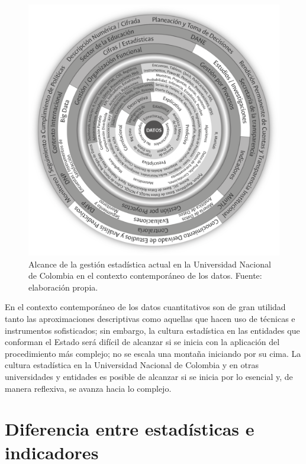 \documentclass[
]{book}
\begin{document}
\begin{figure}

{\centering \includegraphics[width=0.75\linewidth]{imagenes/F_16} 

}

\caption{Alcance de la gestión estadística actual en la Universidad Nacional de Colombia en el contexto contemporáneo de los datos. Fuente: elaboración propia.}\label{fig:fig16}
\end{figure}

En el contexto contemporáneo de los datos cuantitativos son de gran utilidad tanto las aproximaciones descriptivas como aquellas que hacen uso de técnicas e instrumentos sofisticados; sin embargo, la cultura estadística en las entidades que conforman el Estado será difícil de alcanzar si se inicia con la aplicación del procedimiento más complejo; no se escala una montaña iniciando por su cima. La cultura estadística en la Universidad Nacional de Colombia y en otras universidades y entidades es posible de alcanzar si se inicia por lo esencial y, de manera reflexiva, se avanza hacia lo complejo.

\hypertarget{diferencia-entre-estaduxedsticas-e-indicadores}{%
\section{\texorpdfstring{\textbf{Diferencia entre estadísticas e indicadores}}{Diferencia entre estadísticas e indicadores}}\label{diferencia-entre-estaduxedsticas-e-indicadores}}
\end{document}
